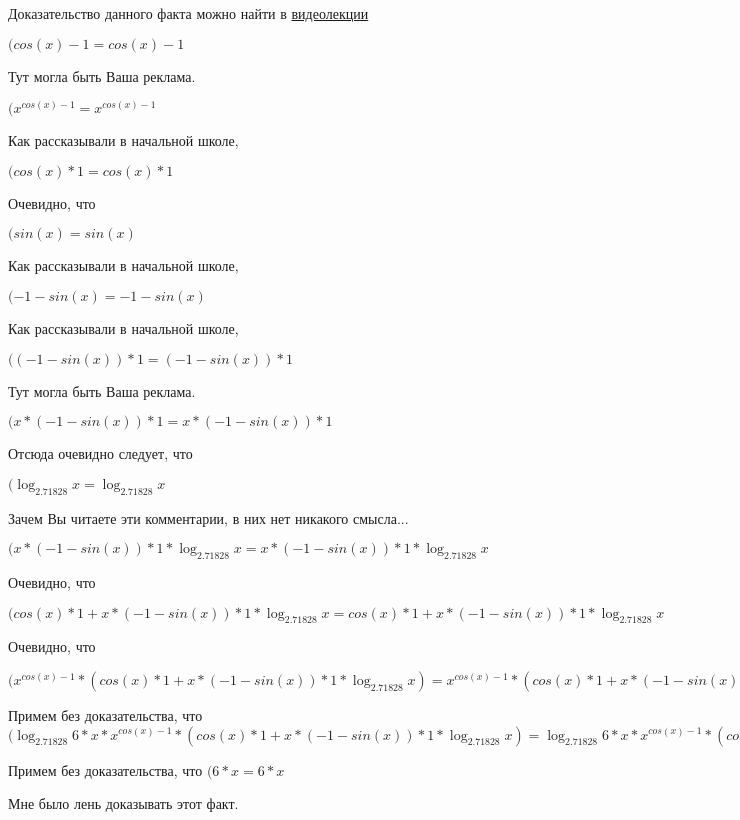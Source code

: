 \documentclass[12pt,a4paper,fleqn]{article}
\theoremstyle{definition}
\begin{document}
Доказательство данного факта можно найти в \href{https://www.youtube.com/watch?v=dQw4w9WgXcQ}{видеолекции}

$(cos( x ) -  1  = cos( x ) -  1 $

Тут могла быть Ваша реклама.

$({ x }^{cos( x ) -  1 } = { x }^{cos( x ) -  1 }$

Как рассказывали в начальной школе,

$(cos( x ) *  1  = cos( x ) *  1 $

Очевидно, что

$(sin( x ) = sin( x )$

Как рассказывали в начальной школе,

$( -1  - sin( x ) =  -1  - sin( x )$

Как рассказывали в начальной школе,

$(( -1  - sin( x )) *  1  = ( -1  - sin( x )) *  1 $

Тут могла быть Ваша реклама.

$( x  * ( -1  - sin( x )) *  1  =  x  * ( -1  - sin( x )) *  1 $

Отсюда очевидно следует, что

$(\log_{ 2.71828 }{ x } = \log_{ 2.71828 }{ x }$

Зачем Вы читаете эти комментарии, в них нет никакого смысла...

$( x  * ( -1  - sin( x )) *  1  * \log_{ 2.71828 }{ x } =  x  * ( -1  - sin( x )) *  1  * \log_{ 2.71828 }{ x }$

Очевидно, что

$(cos( x ) *  1  +  x  * ( -1  - sin( x )) *  1  * \log_{ 2.71828 }{ x } = cos( x ) *  1  +  x  * ( -1  - sin( x )) *  1  * \log_{ 2.71828 }{ x }$

Очевидно, что

$({ x }^{cos( x ) -  1 } * (cos( x ) *  1  +  x  * ( -1  - sin( x )) *  1  * \log_{ 2.71828 }{ x }) = { x }^{cos( x ) -  1 } * (cos( x ) *  1  +  x  * ( -1  - sin( x )) *  1  * \log_{ 2.71828 }{ x })$

Примем без доказательства, что
$(\log_{ 2.71828 }{ 6  *  x } * { x }^{cos( x ) -  1 } * (cos( x ) *  1  +  x  * ( -1  - sin( x )) *  1  * \log_{ 2.71828 }{ x }) = \log_{ 2.71828 }{ 6  *  x } * { x }^{cos( x ) -  1 } * (cos( x ) *  1  +  x  * ( -1  - sin( x )) *  1  * \log_{ 2.71828 }{ x })$

Примем без доказательства, что
$( 6  *  x  =  6  *  x $

Мне было лень доказывать этот факт.
\end{document}
